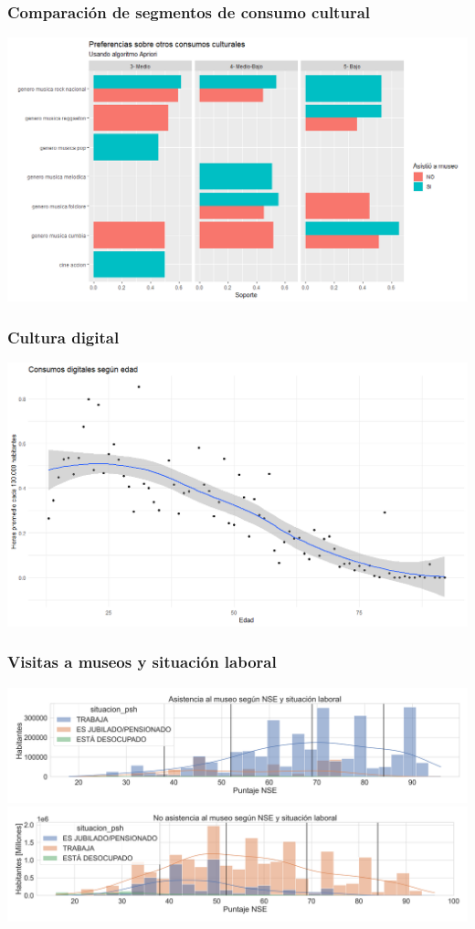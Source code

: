 \documentclass[10pt]{beamer}
\begin{document}
\begin{frame}
  \frametitle{Comparación de segmentos de consumo cultural}

    \includegraphics[width=\textwidth]{itemsets.png}
\end{frame}


\begin{frame}
  \frametitle{Cultura digital}
    \includegraphics[width=\textwidth]{consumos_digitales.png}
\end{frame}


\begin{frame}
  \frametitle{Visitas a museos y situación laboral}
    \includegraphics[height=0.32\textheight]{dist_asistentes_lab.png}
    \vfill
    \includegraphics[height=0.32\textheight]{dist_no_asistentes_lab.png}
\end{frame}
\end{document}
